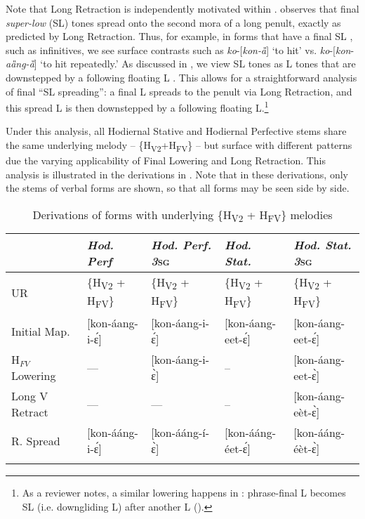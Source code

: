 \documentclass[output=paper,newtxmath,modfonts,nonflat,hidelinks]{langsci/langscibook}
\begin{document}
Note that Long Retraction is independently motivated within . \citet{Roberts-Kohno2014} observes that final \textit{super-low} (SL) tones spread onto the second mora of a long penult, exactly as predicted by Long Retraction. Thus, for example, in forms that have a final SL , such as infinitives, we see surface contrasts such as \textit{ko}-[\textit{kon-ȁ}] ‘to hit’ vs. \textit{ko}-[\textit{kon}-\textit{aȁng-ȁ}] ‘to hit repeatedly.’ As discussed in , we view SL tones as L tones that are downstepped by a following floating L \citep[cf.][]{Clements1981}. This allows for a straightforward analysis of final “SL spreading”: a final L spreads to the penult via Long Retraction, and this spread L is then downstepped by a following floating L.\footnote{As a reviewer notes, a similar lowering happens in : phrase-final L becomes SL (i.e. downgliding L) after another L (\citealt[10]{Mwita2008,Marlo2014}).}

Under this analysis, all Hodiernal Stative and Hodiernal Perfective stems share the same underlying melody – \{H\textsubscript{V2}+H\textsubscript{FV}\} – but surface with different  patterns due the varying applicability of Final Lowering and Long Retraction. This analysis is illustrated in the derivations in . Note that in these derivations, only the stems of verbal forms are shown, so that all forms may be seen side by side.


\begin{table}
\footnotesize
\begin{tabularx}{\textwidth}{l@{~}QQQQ} 
\lsptoprule
 & \textit{Hod. Perf} & \textit{Hod. Perf. 3}\textsc{sg} & \textit{Hod. Stat.} & \textit{Hod. Stat. 3}\textsc{sg}\\
\midrule
UR & \{H\textsubscript{V2} + H\textsubscript{FV}\} & 
	  \{H\textsubscript{V2} + H\textsubscript{FV}\} & 
	      \{H\textsubscript{V2} + H\textsubscript{FV}\} & 
		  \{H\textsubscript{V2} + H\textsubscript{FV}\} \\
{Initial} Map. & [kon-áang-i-\'ɛ] & [kon-áang-i-\'ɛ] & [kon-áang-eet-\'ɛ] & [kon-áang-eet-\'ɛ]\\
H$_{FV}$ Lowering & --- & [kon-áang-i-\`ɛ] & -- & [kon-áang-eet-\`ɛ]\\
{Long V Retract} & --- & --- & -- & [kon-áang-eèt-\`ɛ]\\
{R. Spread} & [kon-ááng-i-\'ɛ] & [kon-ááng-í-\`ɛ] & [kon-ááng-éet-\'ɛ] & [kon-ááng-éèt-\`ɛ]\\
\lspbottomrule
\end{tabularx}
\caption{Derivations of forms with underlying \{H\textsubscript{V2} + H\textsubscript{FV}\} melodies}
\label{tab:jones:5}
\end{table}
 
\end{document}
